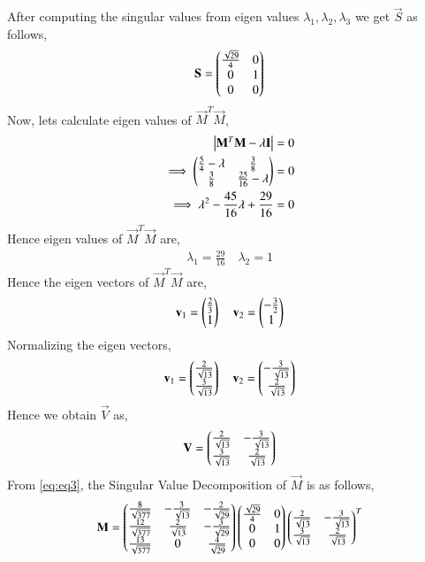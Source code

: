 \documentclass[journal,12pt,twocolumn]{IEEEtran}
\begin{document}
After computing the singular values from eigen values $\lambda_1, \lambda_2, \lambda_3$ we get $\vec{S}$ as follows,
\begin{align}
\mathbf{S}=\begin{pmatrix}\frac{\sqrt{29}}{4}&0\\0&1\\0&0\end{pmatrix}
\end{align}
Now, lets calculate eigen values of $\vec{M}^T\vec{M}$,
\begin{align}
\begin{vmatrix}\mathbf{M}^T\mathbf{M} - \lambda\mathbf{I}\end{vmatrix} &= 0\\
\implies\begin{pmatrix}\frac{5}{4}-\lambda&\frac{3}{8}\\\frac{3}{8}&\frac{25}{16}-\lambda\end{pmatrix} &=0\\
\implies\lambda^2-\frac{45}{16}\lambda+\frac{29}{16} &=0
\end{align}
Hence eigen values of $\vec{M}^T\vec{M}$ are,
\begin{align}
\lambda_1 = \frac{29}{16}\quad
\lambda_2 = 1
\end{align}
Hence the eigen vectors of $\vec{M}^T\vec{M}$ are,
\begin{align}
\mathbf{v}_1=\begin{pmatrix}\frac{2}{3}\\1\end{pmatrix} \quad
\mathbf{v}_2=\begin{pmatrix}-\frac{3}{2}\\1\end{pmatrix}
\end{align}
Normalizing the eigen vectors,
\begin{align}
\mathbf{v}_1=\begin{pmatrix}\frac{2}{\sqrt{13}}\\\frac{3}{\sqrt{13}}\end{pmatrix} \quad
\mathbf{v}_2=\begin{pmatrix}-\frac{3}{\sqrt{13}}\\\frac{2}{\sqrt{13}}\end{pmatrix}
\end{align}
Hence we obtain $\vec{V}$ as,
\begin{align}
\mathbf{V}=\begin{pmatrix}\frac{2}{\sqrt{13}}&-\frac{3}{\sqrt{13}}\\\frac{3}{\sqrt{13}}&\frac{2}{\sqrt{13}}\end{pmatrix}
\end{align}
From \eqref{eq:eq3}, the Singular Value Decomposition of $\vec{M}$ is as follows,
\begin{align}
\mathbf{M} = \begin{pmatrix}\frac{8}{\sqrt{377}}&-\frac{3}{\sqrt{13}}&-\frac{2}{\sqrt{29}}\\\frac{12}{\sqrt{377}}&\frac{2}{\sqrt{13}}&-\frac{3}{\sqrt{29}}\\
\frac{13}{\sqrt{377}}&0&\frac{4}{\sqrt{29}}\end{pmatrix}\begin{pmatrix}\frac{\sqrt{29}}{4}&0\\0&1\\0&0\end{pmatrix}\begin{pmatrix}\frac{2}{\sqrt{13}}&-\frac{3}{\sqrt{13}}\\\frac{3}{\sqrt{13}}&\frac{2}{\sqrt{13}}\end{pmatrix}^T
\end{align}
\end{document}
